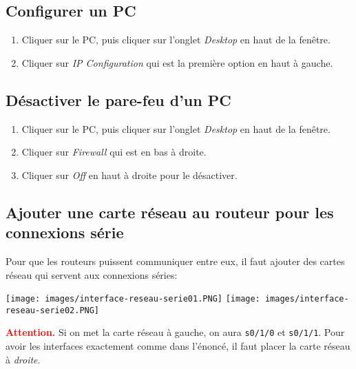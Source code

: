 \documentclass[a4paper]{article}
\begin{document}
\subsection{Configurer un PC}



\begin{enumerate}
    \item Cliquer sur le PC, puis cliquer sur l'onglet \textit{Desktop} en haut de la fenêtre.
    \item Cliquer sur \textit{IP Configuration} qui est la première option en haut à gauche.
\end{enumerate}





\subsection{Désactiver le pare-feu d'un PC}



\begin{enumerate}
    \item Cliquer sur le PC, puis cliquer sur l'onglet \textit{Desktop} en haut de la fenêtre.
    \item Cliquer sur \textit{Firewall} qui est en bas à droite.
    \item Cliquer sur \textit{Off} en haut à droite pour le désactiver.
\end{enumerate}






\subsection{Ajouter une carte réseau au routeur pour les connexions série}



Pour que les routeurs puissent communiquer entre eux, il faut ajouter des cartes réseau qui servent aux connexions séries:
\begin{center}
    \texttt{[image: images/interface-reseau-serie01.PNG]}
    \texttt{[image: images/interface-reseau-serie02.PNG]}
\end{center}
\textcolor{red}{\textbf{Attention.}} Si on met la carte réseau à gauche, on aura \texttt{s0/1/0} et \texttt{s0/1/1}. Pour avoir les interfaces exactement comme dans l'énoncé, il faut placer la carte réseau à \textit{droite}.
\end{document}
